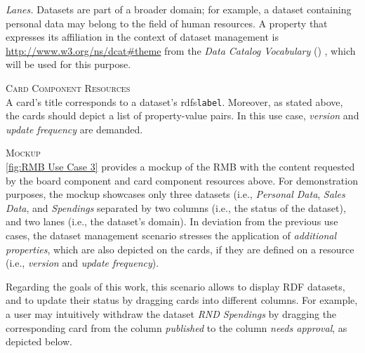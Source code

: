\noindent \hangindent=1.7cm \textit{Lanes.}\tabto{1.7cm} Datasets are part of a broader domain; for example, a dataset containing personal data may belong to the field of human resources. A property that expresses its affiliation in the context of dataset management is \url{http://www.w3.org/ns/dcat\#theme} from the \textit{Data Catalog Vocabulary} () \parencite[]{Erickson2014}, which will be used for this purpose.


\vspace*{\baselineskip}

\noindent \textsc{Card Component Resources}\\
\noindent A card’s title corresponds to a dataset’s \acrshort{rdfs}\texttt{label}. Moreover, as stated above, the cards should depict a list of property-value pairs. In this use case, \textit{version} and \textit{update frequency} are demanded.


\vspace*{\baselineskip}

\noindent \textsc{Mockup}\\
\noindent \autoref{fig:RMB Use Case 3} provides a mockup of the \acrshort*{RMB} with the content requested by the board component and card component resources above. For demonstration purposes, the mockup showcases only three datasets (i.e., \textit{Personal Data}, \textit{Sales Data}, and \textit{ Spendings} separated by two columns (i.e., the status of the dataset), and two lanes (i.e., the dataset’s domain). In deviation from the previous use cases, the dataset management scenario stresses the application of \textit{additional properties}, which are also depicted on the cards, if they are defined on a resource (i.e., \textit{version} and \textit{update frequency}).

\newpage

\noindent Regarding the goals of this work, this scenario allows to display \acrshort*{RDF} datasets, and to update their status by dragging cards into different columns. For example, a user may intuitively withdraw the dataset \textit{RND Spendings} by dragging the corresponding card from the column \textit{published} to the column \textit{needs approval}, as depicted below.




